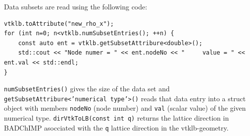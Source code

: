 \documentclass[11pt,a4paper]{report}
\begin{document}
Data subsets are read using the following code:
\begin{verbatim}
vtklb.toAttribute("new_rho_x");
for (int n=0; n<vtklb.numSubsetEntries(); ++n) {
    const auto ent = vtklb.getSubsetAttribure<double>();
    std::cout << "Node numer = " << ent.nodeNo << "     value = " << ent.val << std::endl;
}
\end{verbatim}
\texttt{numSubsetEntries()} gives the size of the data set and \texttt{getSubsetAttribure<'numerical type'>()} reads that data entry into a struct object with members \texttt{nodeNo} (node number) and \texttt{val} (scalar value) of the given numerical type.\newline
\texttt{dirVtkToLB(const int q)} returns the lattice direction in BADChIMP asocciated with the \texttt{q} lattice direction in the vtklb-geometry.
\end{document}
